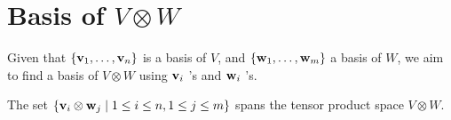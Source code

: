 \section{Basis of \(V \otimes W\)}

Given that \(\left\{  {{\bf v}_1,\ldots ,{\bf v}_n}\right\}\) is a basis of \(V\), and \(\left\{  {{\bf w}_1,\ldots ,{\bf w}_{m}}\right\}\) a basis of \(W\), we aim to find a basis of \(V \otimes  W\) using \({\bf v}_{i}\) ’s and \({\bf w}_{i}\) ’s.

\begin{proposition}\label{prop: tensor-span}
    The set \(\left\{  {{\bf v}_{i} \otimes  {\bf w}_{j} \mid  1 \leq  i \leq  n,1 \leq  j \leq  m}\right\}\) spans the tensor product space \(V \otimes  W\).
\end{proposition}

